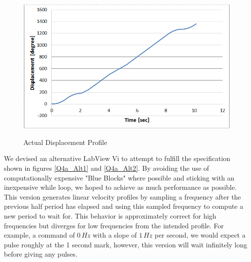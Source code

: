 \documentclass{article}
\theoremstyle{plain}
\theoremstyle{definition}
\theoremstyle{remark}
\begin{document}
\begin{figure}[h!]
\begin{center}
\includegraphics[width=12cm]{Q4_Trapezoid_Displacement_Fail.png}
\caption{Actual Displacement Profile} \label{tex}
\label{fig:q4_4}
\end{center}
\end{figure}


\clearpage

We devised an alternative LabView Vi to attempt to fulfill the specification shown in figures \ref{Q4a_Alt1} and \ref{Q4a_Alt2}.  By avoiding the use of computationally expensive "Blue Blocks" where possible and sticking with an inexpensive while loop, we hoped to achieve as much performance as possible.  This version generates linear velocity profiles by sampling a frequency after the previous half period has elapsed and using this sampled frequency to compute a new period to wait for.  This behavior is approximately correct for high frequencies but diverges for low frequencies from the intended profile.  For example, a command of $0 \, Hz$ with a slope of $1 \, Hz$ per second, we would expect a pulse roughly at the 1 second mark, however, this version will wait infinitely long before giving any pulses.  
\end{document}
